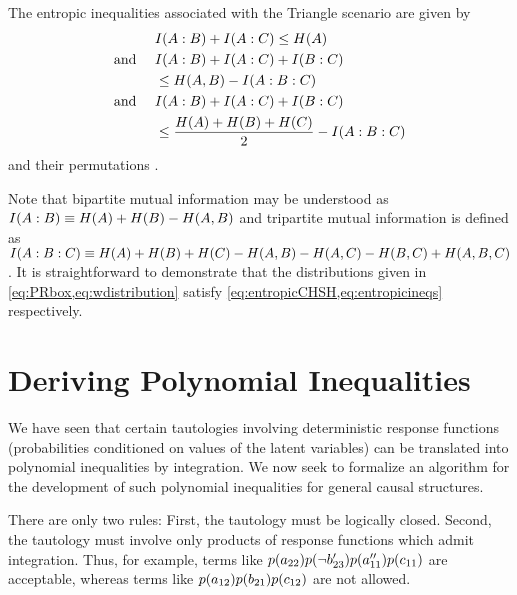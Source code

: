 \begin{EDITING...}
The entropic inequalities associated with the Triangle scenario are given by 
\begin{align}\begin{split}\label{eq:entropicineqs}
&I\lparen A:B\rparen+I\lparen A:C\rparen\leq H\lparen A\rparen \\
\text{and }\quad&I\lparen A:B\rparen+I\lparen A:C\rparen+I\lparen B:C\rparen\\
& \leq H\lparen A,B\rparen-I\lparen A:B:C\rparen\\
\text{and }\quad & I\lparen A:B\rparen+I\lparen A:C\rparen+I\lparen B:C\rparen
\\& \leq\frac{H\lparen A\rparen+H\lparen B\rparen+H\lparen C\rparen}{2}-I\lparen A:B:C\rparen
\end{split}\end{align}
and their permutations \cite{chaves2014novel,Chaves2015infoquantum,pusey2014gdag}.

Note that bipartite mutual information may be understood as $I\lparen A:B\rparen\equiv H\lparen A\rparen+H\lparen B\rparen-H\lparen A,B\rparen$ and tripartite mutual information is defined as $I\lparen A:B:C\rparen\equiv H\lparen A\rparen+H\lparen B\rparen+H\lparen C\rparen-H\lparen A,B\rparen-H\lparen A,C\rparen-H\lparen B,C\rparen+H\lparen A,B,C\rparen$. It is straightforward to demonstrate that the distributions given in \cref{eq:PRbox,eq:wdistribution} satisfy  \cref{eq:entropicCHSH,eq:entropicineqs} respectively.



\section{Deriving Polynomial Inequalities}


We have seen that certain tautologies involving deterministic response functions (probabilities conditioned on values of the latent variables) can be translated into polynomial inequalities by integration. We now seek to formalize an algorithm for the development of such polynomial inequalities for general causal structures.

There are only two rules: First, the tautology must be logically closed. Second, the tautology must involve only products of response functions which admit integration.
Thus, for example, terms like $\p{a_{22}}\p{\nb'_{23}}\p{a''_{11}}\p{c_{11}}$ are acceptable, whereas terms like $\p{a_{12}}\p{b_{21}}\p{c_{12}}$ are not allowed.



\end{EDITING...}
